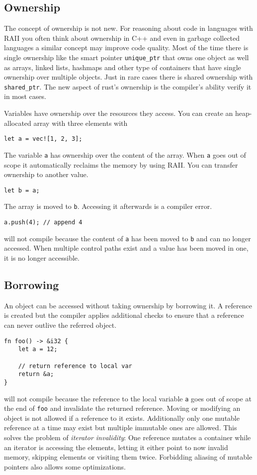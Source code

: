 \documentclass[conference,twocolumn]{IEEEtran}
\begin{document}
\subsection{Ownership}
The concept of ownership is not new. For reasoning about code in languages with RAII you often think about ownership in C++ and even in garbage collected languages a similar concept may improve code quality. Most of the time there is single ownership like the smart pointer \verb|unique_ptr| that owns one object as well as arrays, linked lists, hashmaps and other type of containers that have single ownership over multiple objects. Just in rare cases there is shared ownership with \verb|shared_ptr|.
The new aspect of rust's ownership is the compiler's ability verify it in most cases.

\vline

Variables have ownership over the resources they access.
You can create an heap-allocated array with three elements with
\begin{lstlisting}
let a = vec![1, 2, 3];
\end{lstlisting}
The variable \verb|a| has ownership over the content of the array. When \verb|a| goes out of scope it automatically reclaims the memory by using RAII.
You can transfer ownership to another value.
\begin{lstlisting}
let b = a;
\end{lstlisting}
The array is moved to \verb|b|. Accessing it afterwards is a compiler error.

\begin{lstlisting}
a.push(4); // append 4
\end{lstlisting}
will not compile because the content of \verb|a| has been moved to \verb|b| and can no longer accessed.
When multiple control paths exist and a value has been moved in one, it is no longer accessible.





\subsection{Borrowing}
An object can be accessed without taking ownership by borrowing it. A reference is created but the compiler applies additional checks to ensure that a reference can never outlive the referred object.

\begin{lstlisting}
fn foo() -> &i32 {
    let a = 12;
    
    // return reference to local var
    return &a;
}
\end{lstlisting}
will not compile because the reference to the local variable \verb|a| goes out of scope at the end of \verb|foo| and invalidate the returned reference.
Moving or modifying an object is not allowed if a reference to it exists.
Additionally only one mutable reference at a time may exist but multiple immutable ones are allowed. This solves the problem of \emph{iterator invalidity}: One reference mutates a container while an iterator is accessing the elements, letting it either point to now invalid memory, skipping elements or visiting them twice.
Forbidding aliasing of mutable pointers also allows some optimizations.
\end{document}
